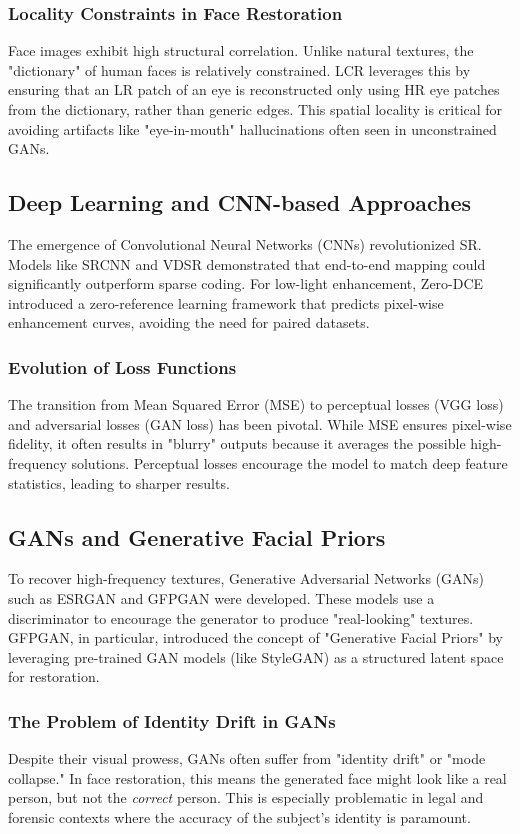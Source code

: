 \subsubsection{Locality Constraints in Face Restoration}
Face images exhibit high structural correlation. Unlike natural textures, the "dictionary" of human faces is relatively constrained. LCR leverages this by ensuring that an LR patch of an eye is reconstructed only using HR eye patches from the dictionary, rather than generic edges. This spatial locality is critical for avoiding artifacts like "eye-in-mouth" hallucinations often seen in unconstrained GANs.

\subsection{Deep Learning and CNN-based Approaches}
The emergence of Convolutional Neural Networks (CNNs) revolutionized SR. Models like SRCNN and VDSR demonstrated that end-to-end mapping could significantly outperform sparse coding. For low-light enhancement, Zero-DCE \cite{li2020zero} introduced a zero-reference learning framework that predicts pixel-wise enhancement curves, avoiding the need for paired datasets.

\subsubsection{Evolution of Loss Functions}
The transition from Mean Squared Error (MSE) to perceptual losses (VGG loss) and adversarial losses (GAN loss) has been pivotal. While MSE ensures pixel-wise fidelity, it often results in "blurry" outputs because it averages the possible high-frequency solutions. Perceptual losses encourage the model to match deep feature statistics, leading to sharper results.

\subsection{GANs and Generative Facial Priors}
To recover high-frequency textures, Generative Adversarial Networks (GANs) such as ESRGAN and GFPGAN \cite{wang2021towards} were developed. These models use a discriminator to encourage the generator to produce "real-looking" textures. GFPGAN, in particular, introduced the concept of "Generative Facial Priors" by leveraging pre-trained GAN models (like StyleGAN) as a structured latent space for restoration.

\subsubsection{The Problem of Identity Drift in GANs}
Despite their visual prowess, GANs often suffer from "identity drift" or "mode collapse." In face restoration, this means the generated face might look like a real person, but not the \textit{correct} person. This is especially problematic in legal and forensic contexts where the accuracy of the subject's identity is paramount.

